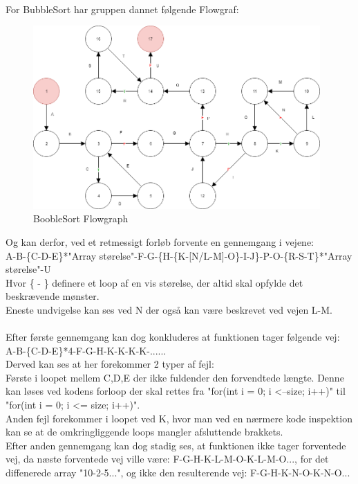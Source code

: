 \documentclass[11pt]{article}
\begin{document}
    \\
    \noindent
    For BubbleSort har gruppen dannet følgende Flowgraf:\\
    \begin{subfigure}{1\textwidth}
        \centering
        \includegraphics[width=1\linewidth, height=7cm]{Struktureret_System_Udvikling/Workshop_3/Booble_Sort_Flowgraph.png}
        \caption{BoobleSort Flowgraph}
        \label{fig:BoobleSortGraph}
    \end{subfigure}
    Og kan derfor, ved et retmessigt forløb forvente en gennemgang i vejene:\\
    A-B-\{C-D-E\}*"Array størelse"-F-G-\{H-\{K-[N/L-M]-O\}-I-J\}-P-O-\{R-S-T\}*"Array størelse"-U\\
    Hvor \{ - \} definere et loop af en vis størelse, der altid skal opfylde det beskrævende mønster.\\
    Eneste undvigelse kan ses ved N der også kan være beskrevet ved vejen L-M.\\
    \\
    Efter første gennemgang kan dog konkluderes at funktionen tager følgende vej:\\
    A-B-\{C-D-E\}*4-F-G-H-K-K-K-K-......\\
    Derved kan ses at her forekommer 2 typer af fejl:\\
    Første i loopet mellem C,D,E der ikke fuldender den forvendtede længte. Denne kan løses ved kodens forloop der skal rettes fra "for(int i = 0; i \textless --size; i++)" til "for(int i = 0; i \textless= size; i++)".\\
    Anden fejl forekommer i loopet ved K, hvor man ved en nærmere kode inspektion kan se at de omkringliggende loops mangler afsluttende brakkets.\\
    Efter anden gennemgang kan dog stadig ses, at funktionen ikke tager forventede vej, da næste forventede vej ville være: F-G-H-K-L-M-O-K-L-M-O..., for det diffenerede array "10-2-5...", og ikke den resulterende vej: F-G-H-K-N-O-K-N-O...\\
\end{document}
